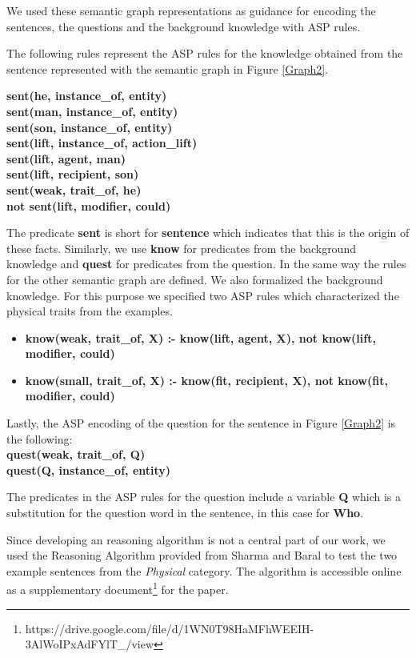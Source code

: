 We used these semantic graph representations as guidance for encoding the sentences, the questions and the background knowledge with ASP rules. 

The following rules represent the ASP rules for the knowledge obtained from the sentence represented with the semantic graph in Figure \ref{Graph2}. 

\textbf{sent(he, instance\_of, entity)} \\
\textbf{sent(man, instance\_of, entity)}\\
\textbf{sent(son, instance\_of, entity)}\\
\textbf{sent(lift, instance\_of, action\_lift)} \\ 
\textbf{sent(lift, agent, man)}\\
\textbf{sent(lift, recipient, son)}\\
\textbf{sent(weak, trait\_of, he)} \\
\textbf{not sent(lift, modifier, could)}

The predicate \textbf{sent} is short for \textbf{sentence} which indicates that this is the origin of these facts. Similarly, we use \textbf{know} for predicates from the background knowledge and \textbf{quest} for predicates from the question. 
In the same way the rules for the other semantic graph are defined. 
We also formalized the background knowledge. For this purpose we specified two ASP rules which characterized the physical traits from the examples.

\begin{itemize}
	\item \textbf{know(weak, trait\_of, X) :- know(lift, agent, X), not know(lift, modifier, could)}
	\item \textbf{know(small, trait\_of, X) :- know(fit, recipient, X), not know(fit, modifier, could)}
\end{itemize}

Lastly, the ASP encoding of the question for the sentence in Figure \ref{Graph2} is the following: \\
\textbf{quest(weak, trait\_of, Q) \\
		quest(Q, instance\_of, entity)}

The predicates in the ASP rules for the question include a variable \textbf{Q} which is a substitution for the question word in the sentence, in this case for \textbf{Who}. 

Since developing an reasoning algorithm is not a central part of our work, we used the Reasoning Algorithm provided from Sharma and Baral \cite{2018CommonsenseKT} to test the two example sentences from the \textit{Physical} category. The algorithm is accessible online as a supplementary document\footnote{https://drive.google.com/file/d/1WN0T98HaMFhWEEIH-3AlWoIPxAdFYlT\_/view} for the paper. 

